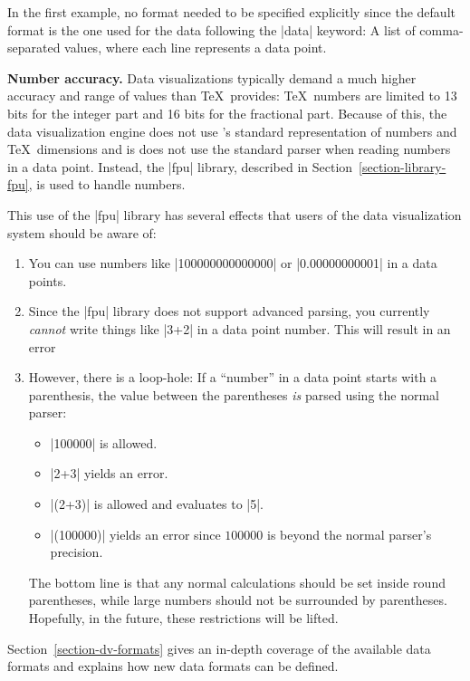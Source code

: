 In the first example, no format needed to be specified explicitly
since the default format is the one used for the data following the
|data| keyword: A list of comma-separated values, where each line
represents a data point.

\medskip
\textbf{Number accuracy.}\label{section-dv-expressions}
Data visualizations typically demand a much higher accuracy and range
of values than \TeX\ provides: \TeX\ numbers are limited to 13 bits
for the integer part and 16 bits for the fractional part. Because of
this, the data visualization engine does not use \pgfname's standard
representation of numbers and \TeX\ dimensions and is does not use the
standard parser when reading numbers in a data point. Instead, the
|fpu| library, described in Section~\ref{section-library-fpu}, is used
to handle numbers.

This use of the |fpu| library has several effects that users of the data
visualization system should be aware of:
\begin{enumerate}
\item You can use numbers like |100000000000000| or |0.00000000001| in
  a data points.
\item Since the |fpu| library does not support advanced parsing, you
  currently \emph{cannot} write things like |3+2| in a data point
  number. This will result in an error
\item However, there is a loop-hole: If a ``number'' in a data point
  starts with a parenthesis, the value between the parentheses
  \emph{is} parsed using the normal parser:
  \begin{itemize}
  \item |100000| is allowed.
  \item |2+3| yields an error.
  \item |(2+3)| is allowed and evaluates to |5|.
  \item |(100000)| yields an error since $100000$ is beyond the normal
    parser's precision.
  \end{itemize}
  The bottom line is that any normal calculations should be set inside
  round parentheses, while large numbers should not be surrounded by
  parentheses. Hopefully, in the future, these restrictions will be
  lifted.
\end{enumerate}


Section~\ref{section-dv-formats} gives an
in-depth coverage of the available data formats and explains how new
data formats can be defined.




